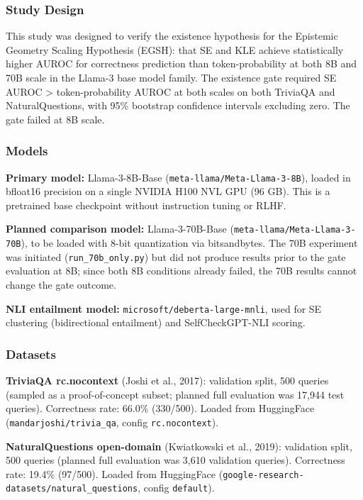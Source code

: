 
\subsubsection{Study Design}

This study was designed to verify the existence hypothesis for the Epistemic Geometry Scaling Hypothesis (EGSH): that SE and KLE achieve statistically higher AUROC for correctness prediction than token-probability at both 8B and 70B scale in the Llama-3 base model family. The existence gate required SE AUROC > token-probability AUROC at both scales on both TriviaQA and NaturalQuestions, with 95\% bootstrap confidence intervals excluding zero. The gate failed at 8B scale.

\subsubsection{Models}

\textbf{Primary model:} Llama-3-8B-Base (\texttt{meta-llama/Meta-Llama-3-8B}), loaded in bfloat16 precision on a single NVIDIA H100 NVL GPU (96 GB). This is a pretrained base checkpoint without instruction tuning or RLHF.

\textbf{Planned comparison model:} Llama-3-70B-Base (\texttt{meta-llama/Meta-Llama-3-70B}), to be loaded with 8-bit quantization via bitsandbytes. The 70B experiment was initiated (\texttt{run_70b_only.py}) but did not produce results prior to the gate evaluation at 8B; since both 8B conditions already failed, the 70B results cannot change the gate outcome.

\textbf{NLI entailment model:} \texttt{microsoft/deberta-large-mnli}, used for SE clustering (bidirectional entailment) and SelfCheckGPT-NLI scoring.

\subsubsection{Datasets}

\textbf{TriviaQA rc.nocontext} (Joshi et al., 2017): validation split, 500 queries (sampled as a proof-of-concept subset; planned full evaluation was 17,944 test queries). Correctness rate: 66.0\% (330/500). Loaded from HuggingFace (\texttt{mandarjoshi/trivia_qa}, config \texttt{rc.nocontext}).

\textbf{NaturalQuestions open-domain} (Kwiatkowski et al., 2019): validation split, 500 queries (planned full evaluation was 3,610 validation queries). Correctness rate: 19.4\% (97/500). Loaded from HuggingFace (\texttt{google-research-datasets/natural_questions}, config \texttt{default}).

